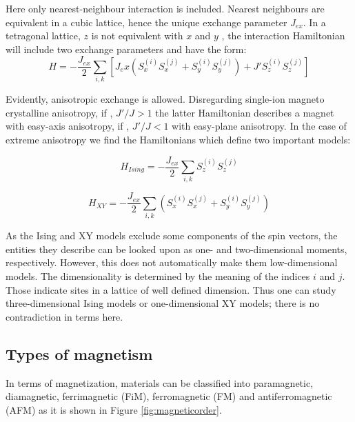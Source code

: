 Here only nearest-neighbour interaction is included. Nearest neighbours are equivalent in a cubic lattice, hence the unique exchange parameter $J_{ex}$. In a tetragonal lattice, $z$ is not equivalent with $x$ and $y$ , the interaction Hamiltonian will include two exchange parameters and have the form:
\begin{equation}
H = -\frac{J_{ex}}{2}\sum \limits_{i, k}  \left[ J_ex \left( S^{(i)}_x S^{(j)}_x + S^{(i)}_y S^{(j)}_y \right) +J' S^{(i)}_z S^{(j)}_z \right]
\end{equation}

Evidently, anisotropic exchange is allowed. Disregarding single-ion magneto crystalline anisotropy, if , $J'/J>1$ the latter Hamiltonian describes a magnet with easy-axis anisotropy, if , $J'/J < 1$ with easy-plane anisotropy. 
In the case of extreme anisotropy we find the Hamiltonians which define two important models:

\begin{equation}
H_{Ising} = -\frac{J_{ex}}{2}\sum \limits_{i, k} S^{(i)}_z S^{(j)}_z 
\end{equation}

\begin{equation}
H_{XY} = -\frac{J_{ex}}{2}\sum \limits_{i, k} \left( S^{(i)}_x S^{(j)}_x + S^{(i)}_y S^{(j)}_y \right)
\end{equation}

As the Ising and XY models exclude some components of the spin vectors, the entities they describe can be looked upon as one- and two-dimensional moments, respectively.
However, this does not automatically make them low-dimensional models. The dimensionality is determined by the meaning of the indices $i$ and $j$. Those indicate sites in a lattice of well defined dimension.
Thus one can study three-dimensional Ising models or one-dimensional XY models; there is no contradiction in terms here.




\subsection{Types of magnetism}\label{sec:ordering}
In terms of magnetization, materials can be classified into paramagnetic, diamagnetic, ferrimagnetic (FiM), ferromagnetic (FM) and antiferromagnetic (AFM) as it is shown in Figure \ref{fig:magneticorder}.

